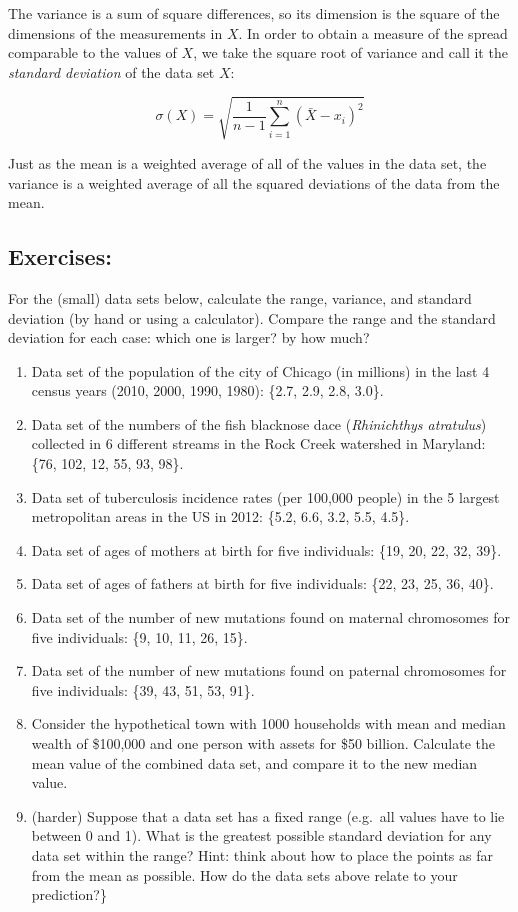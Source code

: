 \documentclass[
  letterpaper,
  DIV=11,
  numbers=noendperiod]{scrreprt}
\begin{document}
The variance is a sum of square differences, so its dimension is the
square of the dimensions of the measurements in \(X\). In order to
obtain a measure of the spread comparable to the values of \(X\), we
take the square root of variance and call it the
 \emph{standard deviation} of the data
set \(X\):

\begin{equation}
\sigma(X) = \sqrt{\frac{1}{n-1} \sum_{i=1}^n (\bar X - x_i)^2}
\end{equation}

Just as the mean is a weighted average of all of the values in the data
set, the variance is a weighted average of all the squared deviations of
the data from the mean.

\hypertarget{exercises-8}{%
\subsection{Exercises:}\label{exercises-8}}

For the (small) data sets below, calculate the range, variance, and
standard deviation (by hand or using a calculator). Compare the range
and the standard deviation for each case: which one is larger? by how
much?

\begin{enumerate}
\def\labelenumi{\arabic{enumi}.}
\item
  Data set of the population of the city of Chicago (in millions) in the
  last 4 census years (2010, 2000, 1990, 1980): \{2.7, 2.9, 2.8, 3.0\}.
\item
  Data set of the numbers of the fish blacknose dace (\emph{Rhinichthys
  atratulus}) collected in 6 different streams in the Rock Creek
  watershed in Maryland: \{76, 102, 12, 55, 93, 98\}.
\item
  Data set of tuberculosis incidence rates (per 100,000 people) in the 5
  largest metropolitan areas in the US in 2012: \{5.2, 6.6, 3.2, 5.5,
  4.5\}.
\item
  Data set of ages of mothers at birth for five individuals: \{19, 20,
  22, 32, 39\}.
\item
  Data set of ages of fathers at birth for five individuals: \{22, 23,
  25, 36, 40\}.
\item
  Data set of the number of new mutations found on maternal chromosomes
  for five individuals: \{9, 10, 11, 26, 15\}.
\item
  Data set of the number of new mutations found on paternal chromosomes
  for five individuals: \{39, 43, 51, 53, 91\}.
\item
  Consider the hypothetical town with 1000 households with mean and
  median wealth of \$100,000 and one person with assets for \$50
  billion. Calculate the mean value of the combined data set, and
  compare it to the new median value.
\item
  (harder) Suppose that a data set has a fixed range (e.g.~all values
  have to lie between 0 and 1). What is the greatest possible standard
  deviation for any data set within the range? Hint: think about how to
  place the points as far from the mean as possible. How do the data
  sets above relate to your prediction?\}
\end{enumerate}
\end{document}

